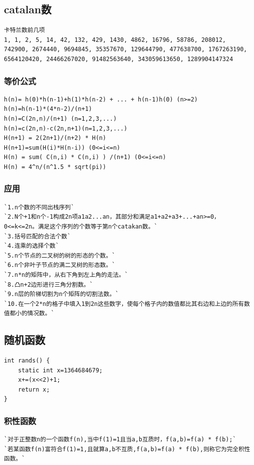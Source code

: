 \documentclass[a4paper]{article}
\begin{document}
\begin{CJK*}{UTF8}{gbsn}
\begin{multicols}{3}
\begin{flushleft}
\subsection{catalan数}
\begin{lstlisting}
卡特兰数前几项
1, 1, 2, 5, 14, 42, 132, 429, 1430, 4862, 16796, 58786, 208012, 742900, 2674440, 9694845, 35357670, 129644790, 477638700, 1767263190, 6564120420, 24466267020, 91482563640, 343059613650, 1289904147324 
\end{lstlisting}

\subsubsection{等价公式}
\begin{lstlisting}
h(n)= h(0)*h(n-1)+h(1)*h(n-2) + ... + h(n-1)h(0) (n>=2)
h(n)=h(n-1)*(4*n-2)/(n+1)
h(n)=C(2n,n)/(n+1) (n=1,2,3,...)
h(n)=c(2n,n)-c(2n,n+1)(n=1,2,3,...)
H(n+1) = 2(2n+1)/(n+2) * H(n)
H(n+1)=sum(H(i)*H(n-i)) (0<=i<=n)
H(n) = sum( C(n,i) * C(n,i) ) /(n+1) (0<=i<=n)
H(n) = 4^n/(n^1.5 * sqrt(pi))
\end{lstlisting}

\subsubsection{应用}
\begin{lstlisting}
`1.n个数的不同出栈序列`
`2.N个+1和n个-1构成2n项a1a2...an，其部分和满足a1+a2+a3+...+an>=0，0<=k<=2n。满足这个序列的个数等于第n个catakan数。`
`3.括号匹配的合法个数`
`4.连乘的选择个数`
`5.n个节点的二叉树的树的形态的个数。`
`6.n个非叶子节点的满二叉树的形态数。`
`7.n*n的矩阵中，从右下角到左上角的走法。`
`8.凸n+2边形进行三角分割数。`
`9.n层的阶梯切割为n个矩阵的切割法数。`
`10.在一个2*n的格子中填入1到2n这些数字，使每个格子内的数值都比其右边和上边的所有数值都小的情况数。`
\end{lstlisting}

\subsection{随机函数}
\begin{lstlisting}
int rands() {
    static int x=1364684679;
    x+=(x<<2)+1;
    return x;
}
\end{lstlisting}

\subsubsection{积性函数}
\begin{lstlisting}
`对于正整数n的一个函数f(n),当中f(1)=1且当a,b互质时，f(a,b)=f(a) * f(b);`
`若某函数f(n)富符合f(1)=1,且就算a,b不互质,f(a,b)=f(a) * f(b),则称它为完全积性函数。`


\end{lstlisting}
\end{flushleft}
\end{multicols}
\end{CJK*}
\end{document}
